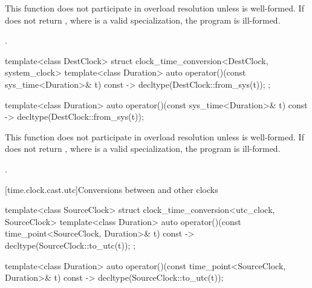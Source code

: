 \begin{itemdescr}
\pnum
\remarks
This function does not participate in overload resolution unless
 is well-formed.
If 
does not return ,
where  is a valid  specialization,
the program is ill-formed.

\pnum
\returns {}.
\end{itemdescr}

\begin{codeblock}
template<class DestClock>
struct clock_time_conversion<DestClock, system_clock> {
  template<class Duration>
    auto operator()(const sys_time<Duration>& t) const
      -> decltype(DestClock::from_sys(t));
};
\end{codeblock}

%
\begin{itemdecl}
template<class Duration>
  auto operator()(const sys_time<Duration>& t) const
    -> decltype(DestClock::from_sys(t));
\end{itemdecl}

\begin{itemdescr}
\pnum
\remarks
This function does not participate in overload resolution unless
 is well-formed.
If  does not return
,
where  is a valid  specialization,
the program is ill-formed.

\pnum
\returns {}.
\end{itemdescr}

[time.clock.cast.utc]{Conversions between  and other clocks}

\begin{codeblock}
template<class SourceClock>
struct clock_time_conversion<utc_clock, SourceClock> {
  template<class Duration>
    auto operator()(const time_point<SourceClock, Duration>& t) const
      -> decltype(SourceClock::to_utc(t));
};
\end{codeblock}

%
\begin{itemdecl}
template<class Duration>
  auto operator()(const time_point<SourceClock, Duration>& t) const
    -> decltype(SourceClock::to_utc(t));
\end{itemdecl}

